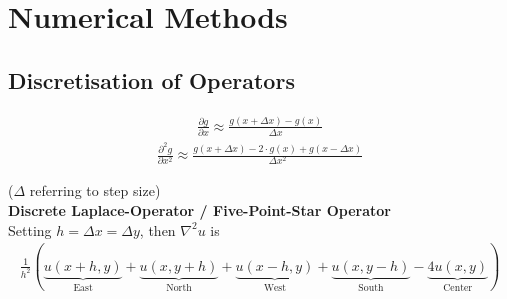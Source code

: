 \section{Numerical Methods}
\subsection{Discretisation of Operators}
\begin{align*}
	\frac{\partial g}{\partial x}
	\approx
	\frac{g(x + \Delta x) - g(x)}{\Delta x}
\end{align*}
\begin{align*}
	\frac{\partial^2 g}{\partial x^2}
	\approx
	\frac{g(x + \Delta x) - 2\cdot g(x) + g(x - \Delta x)}{\Delta x^2}
\end{align*}

($\Delta$ referring to step size)
\\[1em]
\textbf{Discrete Laplace-Operator / Five-Point-Star Operator}
\\
Setting $h = \Delta x = \Delta y$, then $\nabla^2u$ is
\begin{align*}
	\frac{1}{h^{2}}\left(
	\underbrace{u(x+h,y)}_{\text{East}}
	+ \underbrace{u(x,y+h)}_{\text{North}}
	+ \underbrace{u(x-h,y)}_{\text{West}}
	+ \underbrace{u(x,y-h)}_{\text{South}}
	- \underbrace{4u(x,y)}_\text{Center}
	\right)
\end{align*}